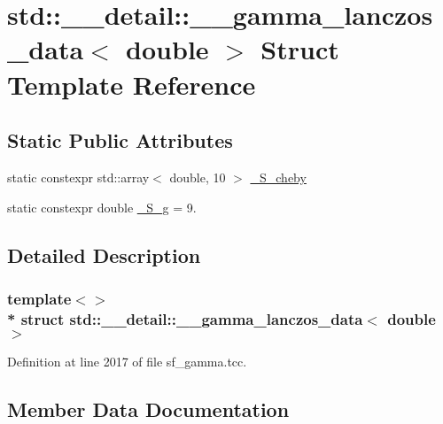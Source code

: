 \hypertarget{structstd_1_1____detail_1_1____gamma__lanczos__data_3_01double_01_4}{}\section{std\+:\+:\+\_\+\+\_\+detail\+:\+:\+\_\+\+\_\+gamma\+\_\+lanczos\+\_\+data$<$ double $>$ Struct Template Reference}
\label{structstd_1_1____detail_1_1____gamma__lanczos__data_3_01double_01_4}
\subsection*{Static Public Attributes}
\begin{DoxyCompactItemize}
\item 
static constexpr std\+::array$<$ double, 10 $>$ \hyperlink{structstd_1_1____detail_1_1____gamma__lanczos__data_3_01double_01_4_a315868c6a789a5e7455f7eb4d8d86115}{\+\_\+\+S\+\_\+cheby}
\item 
static constexpr double \hyperlink{structstd_1_1____detail_1_1____gamma__lanczos__data_3_01double_01_4_ab7959ed84fcc00db67df8b167165513d}{\+\_\+\+S\+\_\+g} = 9.
\end{DoxyCompactItemize}


\subsection{Detailed Description}
\subsubsection*{template$<$$>$\\*
struct std\+::\+\_\+\+\_\+detail\+::\+\_\+\+\_\+gamma\+\_\+lanczos\+\_\+data$<$ double $>$}



Definition at line 2017 of file sf\+\_\+gamma.\+tcc.



\subsection{Member Data Documentation}
